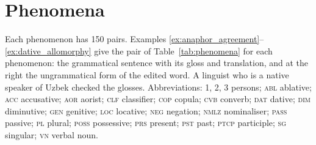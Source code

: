 \documentclass[11pt]{article}
\begin{document}


\appendix

\section{Phenomena}
\label{app:phenomena}

Each phenomenon has 150 pairs. Examples \ref{ex:anaphor_agreement}--\ref{ex:dative_allomorphy} give the pair of Table~\ref{tab:phenomena} for each phenomenon: the grammatical sentence with its gloss and translation, and at the right the ungrammatical form of the edited word. A linguist who is a native speaker of Uzbek checked the glosses. Abbreviations: 1, 2, 3 persons; \textsc{abl} ablative; \textsc{acc} accusative; \textsc{aor} aorist; \textsc{clf} classifier; \textsc{cop} copula; \textsc{cvb} converb; \textsc{dat} dative; \textsc{dim} diminutive; \textsc{gen} genitive; \textsc{loc} locative; \textsc{neg} negation; \textsc{nmlz} nominaliser; \textsc{pass} passive; \textsc{pl} plural; \textsc{poss} possessive; \textsc{prs} present; \textsc{pst} past; \textsc{ptcp} participle; \textsc{sg} singular; \textsc{vn} verbal noun.


\end{document}
